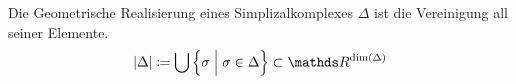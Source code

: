 



\begin{Def}
	Die Geometrische Realisierung eines Simplizalkomplexes $\Delta$ ist
	die Vereinigung all seiner Elemente.
	\begin{gather*}
	|\Delta| \coloneqq \bigcup \left\{ \sigma \; \Big| \; \sigma \in
	\Delta \right\} \subset \R^{\dim(\Delta)}
	\end{gather*}
\end{Def}








